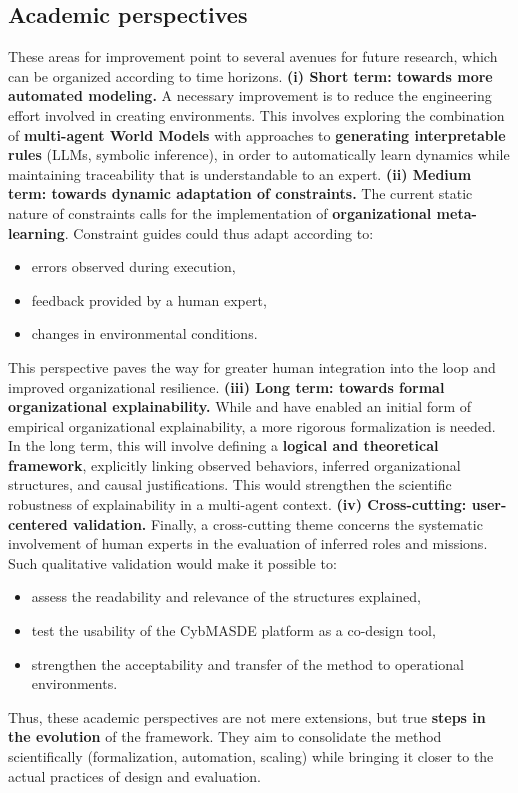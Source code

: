 \subsection* {Academic perspectives}
These areas for improvement point to several avenues for future research, which can be organized according to time horizons.
\medskip
\noindent
\textbf{(i) Short term: towards more automated modeling.}
A necessary improvement is to reduce the engineering effort involved in creating environments.
This involves exploring the combination of \textbf{multi-agent World Models} with approaches to \textbf{generating interpretable rules} (LLMs, symbolic inference), in order to automatically learn dynamics while maintaining traceability that is understandable to an expert.
\medskip
\noindent
\textbf{(ii) Medium term: towards dynamic adaptation of constraints.}
The current static nature of constraints calls for the implementation of \textbf{organizational meta-learning}.
Constraint guides could thus adapt according to:
\begin{itemize}
  \item errors observed during execution,
  \item feedback provided by a human expert,
  \item changes in environmental conditions.
\end{itemize}
This perspective paves the way for greater human integration into the loop and improved organizational resilience.
\medskip
\noindent
\textbf{(iii) Long term: towards formal organizational explainability.}
While  and  have enabled an initial form of empirical organizational explainability, a more rigorous formalization is needed.
In the long term, this will involve defining a \textbf{logical and theoretical framework}, explicitly linking observed behaviors, inferred organizational structures, and causal justifications.
This would strengthen the scientific robustness of explainability in a multi-agent context.
\medskip
\noindent
\textbf{(iv) Cross-cutting: user-centered validation.}
Finally, a cross-cutting theme concerns the systematic involvement of human experts in the evaluation of inferred roles and missions.
Such qualitative validation would make it possible to:
\begin{itemize}

  \item assess the readability and relevance of the structures explained,
  \item test the usability of the CybMASDE platform as a co-design tool,
  \item strengthen the acceptability and transfer of the method to operational environments.
\end{itemize}
\medskip
\noindent
Thus, these academic perspectives are not mere extensions, but true \textbf{steps in the evolution} of the  framework.
They aim to consolidate the method scientifically (formalization, automation, scaling) while bringing it closer to the actual practices of  design and evaluation.
